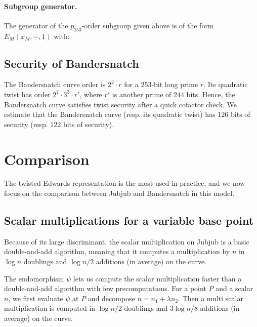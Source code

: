 \documentclass[smallextended]{svjour3}
\newcommand{\ZZ}[1]{\color{cyan}#1\color{black}}
\begin{document}
\paragraph{Subgroup generator.}
The generator of the $p_{253}$-order subgroup given above is of the
form $E_M(x_M,-,1)$ with:


\subsection{Security of Bandersnatch}

The Bandersnatch curve order is $2^2\cdot r$ for a $253$-bit long
prime $r$.
Its quadratic twist has order
$2^7 \cdot 3^3 \cdot r'$, where $r'$ is another prime of $244$ bits.
Hence, the Bandersnatch curve satisfies twist security after a quick cofactor
check.
We estimate that the Bandersnatch curve (resp. its quadratic twist)
has $126$ bits of security (resp. $122$ bits of security).


\section{Comparison}\label{sec:comparison}

The twisted Edwards representation is the most used in practice, and we now focus on the comparison between Jubjub and Bandersnatch in this model.

\subsection{Scalar multiplications for a variable base point}
Because of its large discriminant, the scalar multiplication on Jubjub
is a basic double-and-add algorithm, meaning that it computes a
multiplication by $n$ in $\log n$ doublings and $\log n/2$
additions (in average) on the curve. 

The endomorphism $\psi$ lets us compute the scalar multiplication
faster than a double-and-add algorithm with few precomputations. For a
point $P$ and a scalar $n$, we first evaluate $\psi$ at $P$ and
decompose $n = n_1 + \lambda n_2$. Then a multi scalar multiplication
is computed in $\log n/2$ doublings and $3\log n/8$ additions (in average) on the curve.
\end{document}
